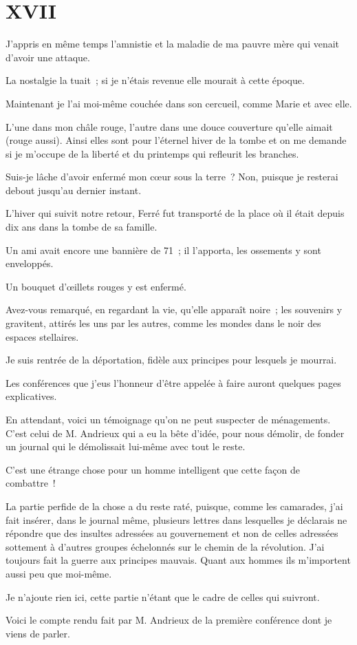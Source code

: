 \documentclass[french,twoside]{book} %
\newcommand\chapteropen{} %
\newcommand\chaptercont{} %
\begin{document}
\chapteropen
 \chapter[{XVII}]{XVII}
\label{p1.17}

\chaptercont
\noindent J’appris en même temps l’amnistie et la maladie de ma pauvre mère qui venait d’avoir une attaque.\par
La nostalgie la tuait ; si je n’étais revenue elle mourait à cette époque.\par
Maintenant je l’ai moi-même couchée dans son cercueil, comme Marie et avec elle.\par
L’une dans mon châle rouge, l’autre dans une douce couverture qu’elle aimait (rouge aussi). Ainsi elles sont pour l’éternel hiver de la tombe et on me demande si je m’occupe de la liberté et du printemps qui refleurit les branches.\par
Suis-je lâche d’avoir enfermé mon cœur sous la terre ? Non, puisque je resterai debout jusqu’au dernier instant.\par
L’hiver qui suivit notre retour, Ferré fut transporté de la place où il était depuis dix ans dans la tombe de sa famille.\par
 Un ami avait encore une bannière de 71 ; il l’apporta, les ossements y sont enveloppés.\par
Un bouquet d’œillets rouges y est enfermé.\par
Avez-vous remarqué, en regardant la vie, qu’elle apparaît noire ; les souvenirs y gravitent, attirés les uns par les autres, comme les mondes dans le noir des espaces stellaires.\par
Je suis rentrée de la déportation, fidèle aux principes pour lesquels je mourrai.\par
Les conférences que j’eus l’honneur d’être appelée à faire auront quelques pages explicatives.\par
En attendant, voici un témoignage qu’on ne peut suspecter de ménagements. C’est celui de M. Andrieux qui a eu la bête d’idée, pour nous démolir, de fonder un journal qui le démolissait lui-même avec tout le reste.\par
C’est une étrange chose pour un homme intelligent que cette façon de combattre !\par
La partie perfide de la chose a du reste raté, puisque, comme les camarades, j’ai fait insérer, dans le journal même, plusieurs lettres dans lesquelles je déclarais ne répondre que des insultes adressées au gouvernement et non de celles adressées sottement à d’autres groupes échelonnés sur le chemin de la révolution. J’ai toujours fait la guerre aux principes mauvais.  Quant aux hommes ils m’importent aussi peu que moi-même.\par
Je n’ajoute rien ici, cette partie n’étant que le cadre de celles qui suivront.\par
Voici le compte rendu fait par M. Andrieux de la première conférence dont je viens de parler.\par
\end{document}
